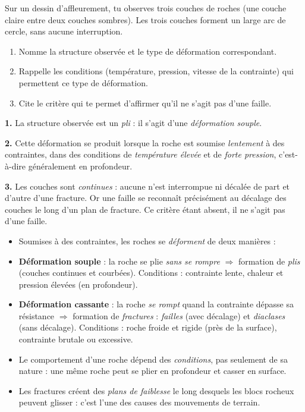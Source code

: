 \documentclass[11pt]{article}
\begin{document}
\begin{exercice}
Sur un dessin d'affleurement, tu observes trois couches de roches (une couche claire entre deux couches sombres). Les trois couches forment un large arc de cercle, sans aucune interruption.
\begin{enumerate}
\item Nomme la structure observée et le type de déformation correspondant.
\item Rappelle les conditions (température, pression, vitesse de la contrainte) qui permettent ce type de déformation.
\item Cite le critère qui te permet d'affirmer qu'il ne s'agit pas d'une faille.
\end{enumerate}
\end{exercice}

\begin{corrige}
\textbf{1.} La structure observée est un \emph{pli} : il s'agit d'une \emph{déformation souple}.

\textbf{2.} Cette déformation se produit lorsque la roche est soumise \emph{lentement} à des contraintes, dans des conditions de \emph{température élevée} et de \emph{forte pression}, c'est-à-dire généralement en profondeur.

\textbf{3.} Les couches sont \emph{continues} : aucune n'est interrompue ni décalée de part et d'autre d'une fracture. Or une faille se reconnaît précisément au décalage des couches le long d'un plan de fracture. Ce critère étant absent, il ne s'agit pas d'une faille.
\end{corrige}

\begin{aretenir}
\begin{itemize}
\item Soumises à des contraintes, les roches se \emph{déforment} de deux manières :
\item \textbf{Déformation souple} : la roche se plie \emph{sans se rompre} $\Rightarrow$ formation de \emph{plis} (couches continues et courbées). Conditions : contrainte lente, chaleur et pression élevées (en profondeur).
\item \textbf{Déformation cassante} : la roche \emph{se rompt} quand la contrainte dépasse sa résistance $\Rightarrow$ formation de \emph{fractures} : \emph{failles} (avec décalage) et \emph{diaclases} (sans décalage). Conditions : roche froide et rigide (près de la surface), contrainte brutale ou excessive.
\item Le comportement d'une roche dépend des \emph{conditions}, pas seulement de sa nature : une même roche peut se plier en profondeur et casser en surface.
\item Les fractures créent des \emph{plans de faiblesse} le long desquels les blocs rocheux peuvent glisser : c'est l'une des causes des mouvements de terrain.
\end{itemize}
\end{aretenir}
\end{document}
